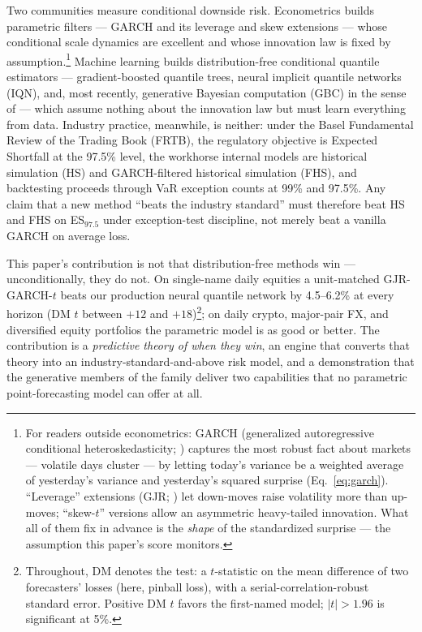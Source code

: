 \documentclass[11pt]{article}
\theoremstyle{remark}
\begin{document}
Two communities measure conditional downside risk. Econometrics builds
parametric filters --- GARCH and its leverage and skew extensions ---
whose conditional scale dynamics are excellent and whose innovation law
is fixed by assumption.\footnote{For readers outside econometrics:
GARCH (generalized autoregressive conditional heteroskedasticity;
\citealp{engle1982, bollerslev1986}) captures the most robust fact
about markets --- volatile days cluster --- by letting today's variance
be a weighted average of yesterday's variance and yesterday's squared
surprise (Eq.~\ref{eq:garch}). ``Leverage'' extensions (GJR;
\citealp{glosten1993}) let down-moves raise volatility more than
up-moves; ``skew-$t$'' versions allow an asymmetric heavy-tailed
innovation. What all of them fix in advance is the \emph{shape} of the
standardized surprise --- the assumption this paper's score monitors.} Machine learning builds distribution-free
conditional quantile estimators --- gradient-boosted quantile trees,
neural implicit quantile networks (IQN), and, most recently, generative
Bayesian computation (GBC) in the sense of \citet{polson2023gbc} ---
which assume nothing about the innovation law but must learn everything
from data. Industry practice, meanwhile, is neither: under the Basel
Fundamental Review of the Trading Book (FRTB), the regulatory objective
is Expected Shortfall at the 97.5\% level, the workhorse internal models
are historical simulation (HS) and GARCH-filtered historical simulation
(FHS), and backtesting proceeds through VaR exception counts at 99\% and
97.5\%. Any claim that a new method ``beats the industry standard'' must
therefore beat HS and FHS on ES$_{97.5}$ under exception-test
discipline, not merely beat a vanilla GARCH on average loss.

This paper's contribution is not that distribution-free methods win ---
unconditionally, they do not. On single-name daily equities a
unit-matched GJR-GARCH-$t$ beats our production neural quantile network
by 4.5--6.2\% at every horizon (DM $t$ between $+12$ and
$+18$)\footnote{Throughout, DM denotes the \citet{dieboldmariano1995}
test: a $t$-statistic on the mean difference of two forecasters' losses
(here, pinball loss), with a serial-correlation-robust standard error.
Positive DM $t$ favors the first-named model; $|t|>1.96$ is significant
at 5\%.}; on
daily crypto, major-pair FX, and diversified equity portfolios the
parametric model is as good or better. The contribution is a
\emph{predictive theory of when they win}, an engine that converts that
theory into an industry-standard-and-above risk model, and a
demonstration that the generative members of the family deliver two
capabilities that no parametric point-forecasting model can offer at
all.
\end{document}
